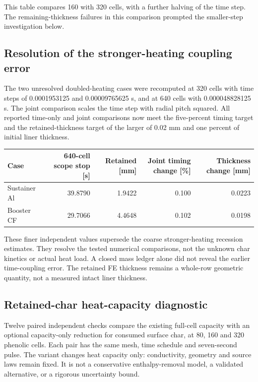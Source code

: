 \documentclass[oneside,openany]{amsdtx}
\begin{document}
This table compares 160 with 320 cells, with a further halving of the time step. The remaining-thickness failures in this comparison prompted the smaller-step investigation below.

\subsection{Resolution of the stronger-heating coupling error}

The two unresolved doubled-heating cases were recomputed at 320 cells with time steps of 0.0001953125 and 0.00009765625 s, and at 640 cells with 0.000048828125 s. The joint comparison scales the time step with radial pitch squared. All reported time-only and joint comparisons now meet the five-percent timing target and the retained-thickness target of the larger of 0.02 mm and one percent of initial liner thickness.

\begin{table}[H]\centering\scriptsize\begin{tabular}{lrrrr}\toprule Case & 640-cell scope stop [s] & Retained [mm] & Joint timing change [\%] & Thickness change [mm]\\\midrule

Sustainer Al & 39.8790 & 1.9422 & 0.100 & 0.0223 \\
Booster CF & 29.7066 & 4.4648 & 0.102 & 0.0198 \\

\bottomrule\end{tabular}\end{table}

These finer independent values supersede the coarse stronger-heating recession estimates. They resolve the tested numerical comparisons, not the unknown char kinetics or actual heat load. A closed mass ledger alone did not reveal the earlier time-coupling error. The retained FE thickness remains a whole-row geometric quantity, not a measured intact liner thickness.

\subsection{Retained-char heat-capacity diagnostic}

Twelve paired independent checks compare the existing full-cell capacity with an optional capacity-only reduction for consumed surface char, at 80, 160 and 320 phenolic cells. Each pair has the same mesh, time schedule and seven-second pulse. The variant changes heat capacity only: conductivity, geometry and source laws remain fixed. It is not a conservative enthalpy-removal model, a validated alternative, or a rigorous uncertainty bound.
\end{document}
